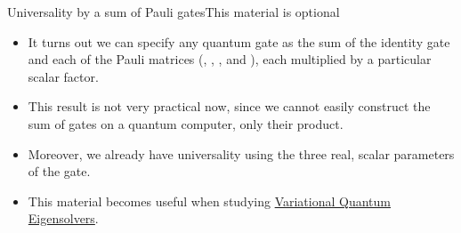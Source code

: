 \begin{frame}{Universality by a sum of Pauli gates}{This material is optional}
\begin{itemize}
    \item It turns out we can specify any quantum gate as the sum of the identity gate and each of the Pauli matrices (\Identity{}, \PauliX{}, \PauliY{}, and \PauliZ{}), each multiplied by a particular scalar factor. 
    \item This result is not very practical now, since we cannot easily construct the sum of gates on a quantum computer, only their product.
    \item Moreover, we already have universality using the three real, scalar parameters of the  gate.
    \item This material becomes useful when studying \href{https://en.wikipedia.org/wiki/Variational_quantum_eigensolver}{Variational Quantum Eigensolvers}.
\end{itemize}
    
\end{frame}


